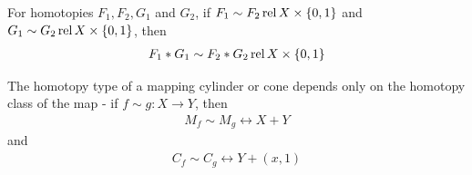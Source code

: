 \begin{exercise}
	For homotopies $F_1, F_2, G_1$ and $G_2$, if $F_1 \sim F_2 \operatorname{rel} X \times \qty{0,1}$ and $G_1 \sim G_2 \operatorname{rel} X \times \qty{0,1}$, then 
	\begin{align*}
		F_1 * G_1 \sim F_2 * G_2 \operatorname{rel} X \times \qty{0,1}
	\end{align*}
\end{exercise}
\begin{theorem}
	The homotopy type of a mapping cylinder or cone depends only on the homotopy class of the map - if $f \sim g : X \to Y$, then 
	\begin{align*}
		M_f \sim M_g \rel X + Y
	\end{align*} 
	and 
	\begin{align*}
		C_f \sim C_g \rel Y + (x,1)
	\end{align*}
\end{theorem}
\clearpage

